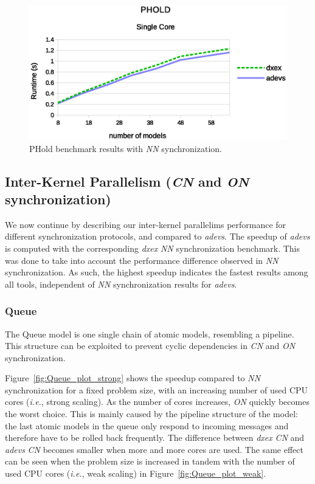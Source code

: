 \begin{figure}
	\center
	\includegraphics[width=\columnwidth]{fig/phold_sequential.eps}
	\caption{PHold benchmark results with \textit{NN} synchronization.}
	\label{fig:Phold_benchmark}
\end{figure}

\subsection{Inter-Kernel Parallelism (\textit{CN} and \textit{ON} synchronization)}
We now continue by describing our inter-kernel parallelims performance for different synchronization protocols, and compared to \textit{adevs}.
The speedup of \textit{adevs} is computed with the corresponding \textit{dxex} \textit{NN} synchronization benchmark.
This was done to take into account the performance difference observed in \textit{NN} synchronization.
As such, the highest speedup indicates the fastest results among all tools, independent of \textit{NN} synchronization results for \textit{adevs}.

\subsubsection{Queue}
The Queue model is one single chain of atomic models, resembling a pipeline.
This structure can be exploited to prevent cyclic dependencies in \textit{CN} and \textit{ON} synchronization.

Figure~\ref{fig:Queue_plot_strong} shows the speedup compared to \textit{NN} synchronization for a fixed problem size, with an increasing number of used CPU cores (\textit{i.e.}, strong scaling).
As the number of cores increases, \textit{ON} quickly becomes the worst choice.
This is mainly caused by the pipeline structure of the model: the last atomic models in the queue only respond to incoming messages and therefore have to be rolled back frequently.
The difference between \textit{dxex} \textit{CN} and \textit{adevs} \textit{CN} becomes smaller when more and more cores are used.
The same effect can be seen when the problem size is increased in tandem with the number of used CPU cores (\textit{i.e.}, weak scaling) in Figure~\ref{fig:Queue_plot_weak}.

